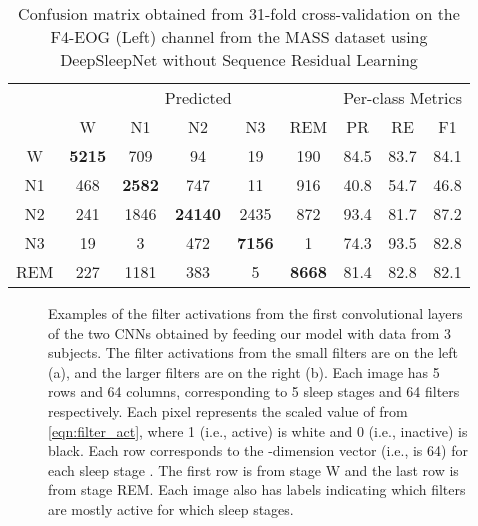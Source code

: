 \documentclass[journal,twoside]{IEEEtran}
\let\MYoriglatexcaption\caption
\renewcommand{\caption}[2][\relax]{\MYoriglatexcaption[#2]{#2}}
\begin{document}
\begin{table}[!t]
\renewcommand{\arraystretch}{1.3}
\caption{Confusion matrix obtained from 31-fold cross-validation on the F4-EOG (Left) channel from the MASS dataset using DeepSleepNet without Sequence Residual Learning}
\label{tab:cm_deepsleepnet_mass_f4_nonseq}
\centering
\begin{tabular}{|c|ccccc|ccc|}
\hline
 & \multicolumn{5}{c|}{Predicted} & \multicolumn{3}{c|}{Per-class Metrics} \\
 & W & N1 & N2 & N3 & REM & PR & RE & F1 \\ \hline
W & \textbf{5215} & 709 & 94 & 19 & 190 & 84.5 & 83.7 & 84.1 \\
N1 & 468 & \textbf{2582} & 747 & 11 & 916 & 40.8 & 54.7 & 46.8 \\
N2 & 241 & 1846 & \textbf{24140} & 2435 & 872 & 93.4 & 81.7 & 87.2 \\
N3 & 19 & 3 & 472 & \textbf{7156} & 1 & 74.3 & 93.5 & 82.8 \\
REM & 227 & 1181 & 383 & 5 & \textbf{8668} & 81.4 & 82.8 & 82.1 \\ \hline
\end{tabular}
\end{table}

\begin{figure*}[!t]
\centering
{}
\hfil
{}
\caption{Examples of the filter activations from the first convolutional layers of the two CNNs obtained by feeding our model with data from 3 subjects. The filter activations from the small filters are on the left (a), and the larger filters are on the right (b). Each image has 5 rows and 64 columns, corresponding to 5 sleep stages and 64 filters respectively. Each pixel represents the scaled value of  from \eqref{eqn:filter_act}, where 1 (i.e., active) is white and 0 (i.e., inactive) is black. Each row corresponds to the -dimension vector (i.e.,  is 64) for each sleep stage . The first row is from stage W and the last row is from stage REM. Each image also has labels indicating which filters are mostly active for which sleep stages.}
\label{fig:active_filters}
\end{figure*}
\end{document}
